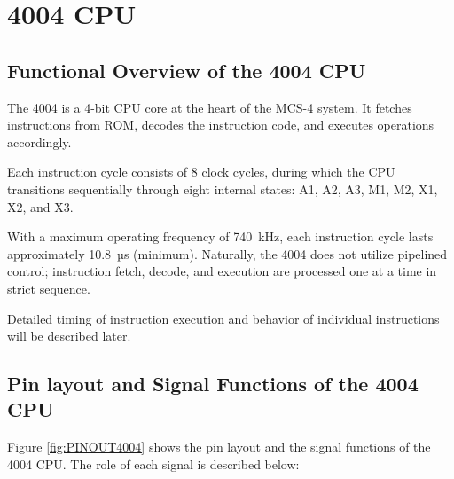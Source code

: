 \section{4004 CPU}
\subsection{Functional Overview of the 4004 CPU}
The 4004 is a 4-bit CPU core at the heart of the MCS-4 system. It fetches instructions from ROM, decodes the instruction code, and executes operations accordingly.

Each instruction cycle consists of 8 clock cycles, during which the CPU transitions sequentially through eight internal states: A1, A2, A3, M1, M2, X1, X2, and X3.

With a maximum operating frequency of 740~kHz, each instruction cycle lasts approximately 10.8~µs (minimum). Naturally, the 4004 does not utilize pipelined control; instruction fetch, decode, and execution are processed one at a time in strict sequence.

Detailed timing of instruction execution and behavior of individual instructions will be described later.
\subsection{Pin layout and Signal Functions of the 4004 CPU}
Figure \ref{fig:PINOUT4004} shows the pin layout and the signal functions of the 4004 CPU. The role of each signal is described below:

